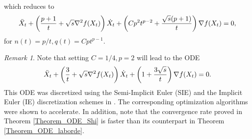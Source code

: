 \documentclass{article}
\theoremstyle{plain}
\theoremstyle{definition}
\theoremstyle{remark}
\newtheorem{remark}{Remark}[theorem]
\begin{document}
which reduces to
\begin{align}\label{HR_cnts_general_npq_p}
     \Ddot{X}_t + \left(\frac{p+1}{t}+\sqrt{s}\nabla^2 f(X_t)\right)\dot{X}_t+\left(Cp^2t^{p-2}+\frac{\sqrt{s}(p+1)}{t}\right)\nabla f(X_t)=0,
\end{align}
for \(n(t)=p/t,q(t)=Cpt^{p-1}\). 
\begin{remark}
    Note that setting \(C=1/4,p=2\) will lead to the ODE 
\begin{align}\label{HR_cnts_general_stable_ODE}
     \Ddot{X}_t + \left(\frac{3}{t}+\sqrt{s}\nabla^2 f(X_t)\right)\dot{X}_t+\left(1+\frac{3\sqrt{s}}{t}\right)\nabla f(X_t)=0.
\end{align}
 This ODE was discretized  using the Semi-Implicit Euler (SIE) and the Implicit Euler (IE) discretization schemes in \citep{shi2019acceleration}. The corresponding optimization algorithms were shown to accelerate. In addition, note that the convergence rate proved in Theorem \ref{Theorem_ODE_Shi} is faster than its counterpart in Theorem \ref{Theorem_ODE_laborde}.
\end{remark}
\end{document}
